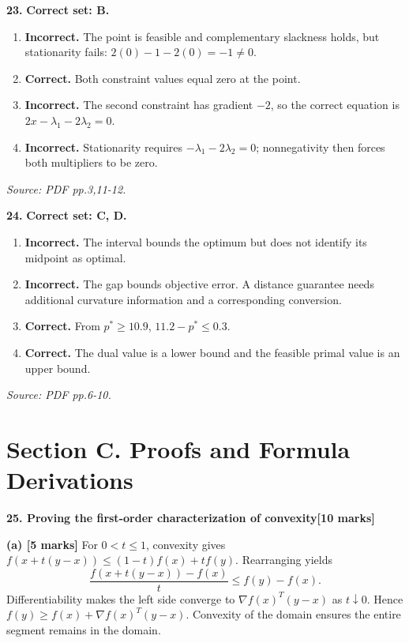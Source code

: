 \documentclass[11pt,a4paper]{article}
\begin{document}
\par\noindent\begin{minipage}{\linewidth}
\textbf{23.} \textbf{Correct set: B.}
\begin{enumerate}[label=(\Alph*),leftmargin=8mm,itemsep=2pt,topsep=2pt]
\item \textbf{Incorrect.} The point is feasible and complementary slackness holds, but stationarity fails: \(2(0)-1-2(0)=-1\ne0\).
\item \textbf{Correct.} Both constraint values equal zero at the point.
\item \textbf{Incorrect.} The second constraint has gradient \(-2\), so the correct equation is \(2x-\lambda_1-2\lambda_2=0\).
\item \textbf{Incorrect.} Stationarity requires \(-\lambda_1-2\lambda_2=0\); nonnegativity then forces both multipliers to be zero.
\end{enumerate}
{\footnotesize\textit{Source: PDF pp.3,11-12.}}

\end{minipage}\par\vspace{3mm}
\par\noindent\begin{minipage}{\linewidth}
\textbf{24.} \textbf{Correct set: C, D.}
\begin{enumerate}[label=(\Alph*),leftmargin=8mm,itemsep=2pt,topsep=2pt]
\item \textbf{Incorrect.} The interval bounds the optimum but does not identify its midpoint as optimal.
\item \textbf{Incorrect.} The gap bounds objective error. A distance guarantee needs additional curvature information and a corresponding conversion.
\item \textbf{Correct.} From \(p^*\ge10.9\), \(11.2-p^*\le0.3\).
\item \textbf{Correct.} The dual value is a lower bound and the feasible primal value is an upper bound.
\end{enumerate}
{\footnotesize\textit{Source: PDF pp.6-10.}}

\end{minipage}\par\vspace{3mm}
\newpage\section*{Section C. Proofs and Formula Derivations}
\textbf{25. Proving the first-order characterization of convexity}\hfill\textbf{[10 marks]}\par\medskip
\textbf{(a) [5 marks]} For \(0<t\le1\), convexity gives \(f(x+t(y-x))\le(1-t)f(x)+tf(y)\). Rearranging yields \[\frac{f(x+t(y-x))-f(x)}{t}\le f(y)-f(x).\] Differentiability makes the left side converge to \(\nabla f(x)^T(y-x)\) as \(t\downarrow0\). Hence \(f(y)\ge f(x)+\nabla f(x)^T(y-x)\). Convexity of the domain ensures the entire segment remains in the domain.
\end{document}
